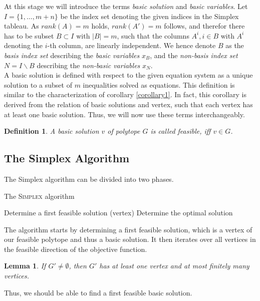 \documentclass[a4paper, 11pt]{article}
\newtheorem{mydef}{Definition}
\newtheorem{lemma}{Lemma}
\begin{document}
At this stage we will introduce the terms \textit{basic solution} and \textit{basic variables}. Let $I=\{1,\dots,m+n\}$ be the index set denoting the given indices in the Simplex tableau. As $rank(A)=m$ holds, $rank(A')=m$ follows, and therefor there has to be subset $B \subset I$ with $|B| = m$, such that the columns $A^i, i\in B$ with $A^i$ denoting the $i$-th column, are linearly independent. We hence denote $B$ as the \textit{basis index set} describing the \textit{basic variables} $x_B$, and the \textit{non-basis index set} $N=I\backslash B$ describing the \textit{non-basic variables} $x_N$.\\

A basic solution is defined with respect to the given equation system as a unique solution to a subset of $m$ inequalities solved as equations. This definition is similar to the characterization of corollary \ref{corollary1}. In fact, this corollary is derived from the relation of basic solutions and vertex, such that each vertex has at least one basic solution. Thus, we will now use these terms interchangeably.\\

\begin{mydef}
	A basic solution $v$ of polytope $G$ is called \emph{feasible}, iff $v\in G$.
\end{mydef}

\subsection{The Simplex Algorithm}
The Simplex algorithm can be divided into two phases.
\begin{algorithm}[H]
	\caption{The \textsc{Simplex} algorithm}
	\label{alg:seq}
	\begin{algorithmic}[1]
		\STATE Determine a first feasible solution (vertex)
		\STATE Determine the optimal solution
	\end{algorithmic}
\end{algorithm}

The algorithm starts by determining a first feasible solution, which is a vertex of our feasible polytope and thus a basic solution. It then iterates over all vertices in the feasible direction of the objective function.

\begin{lemma}
	If $G'\neq\emptyset$, then $G'$ has at least one vertex and at most finitely many vertices.
\end{lemma}

Thus, we should be able to find a first feasible basic solution.\\
\end{document}

